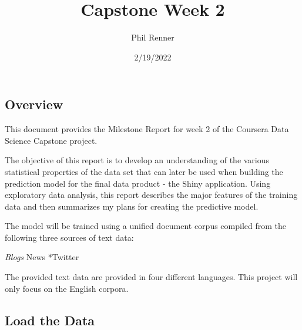 \documentclass[
]{article}
\title{Capstone Week 2}
\author{Phil Renner}
\date{2/19/2022}
\begin{document}
\maketitle

\hypertarget{overview}{%
\subsection{Overview}\label{overview}}

This document provides the Milestone Report for week 2 of the Coursera
Data Science Capstone project.

The objective of this report is to develop an understanding of the
various statistical properties of the data set that can later be used
when building the prediction model for the final data product - the
Shiny application. Using exploratory data analysis, this report
describes the major features of the training data and then summarizes my
plans for creating the predictive model.

The model will be trained using a unified document corpus compiled from
the following three sources of text data:

\emph{Blogs }News *Twitter

The provided text data are provided in four different languages. This
project will only focus on the English corpora.

\hypertarget{load-the-data}{%
\subsection{Load the Data}\label{load-the-data}}
\end{document}
